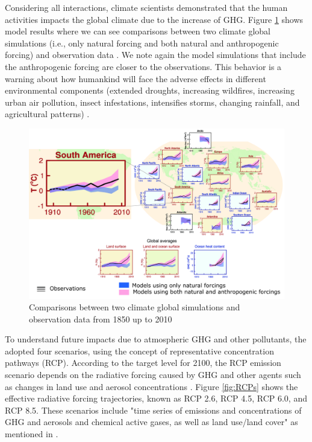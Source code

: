 Considering all interactions, climate scientists demonstrated that the human activities impacts the global climate due to the increase of GHG.
Figure \ref{fig:global} shows model results where we can see comparisons between two climate global simulations (i.e., only natural forcing and both natural and anthropogenic forcing) and observation data \citep{IPCC2013}.
We note again the model simulations that include the anthropogenic forcing are closer to the observations.
This behavior is a warning about how humankind will face the adverse effects in different environmental components (extended droughts, increasing wildfires, increasing urban air pollution, insect infestations, intensifies storms, changing rainfall, and agricultural patterns) \citep{Farmer2013}.

\begin{figure}[htb]
  \begin{center}
    \includegraphics[width=14cm]{fig/FigSPM-06.pdf}
  \end{center}
  \caption{Comparisons between two climate global simulations and observation data from 1850 up to 2010  \citep[ilustration adapted from][]{IPCC2013} }
  \label{fig:global}
\end{figure}

To understand future impacts due to atmospheric GHG and other pollutants, the \citet{IPCC2013} adopted four scenarios, using the concept of representative concentration pathways (RCP). 
According to the target level for 2100, the RCP emission scenario depends on the radiative forcing caused by GHG and other agents such as changes in land use and aerosol concentrations \citep{VanVuuren2011a}. 
Figure \ref{fig:RCPs} shows the effective radiative forcing trajectories, known as RCP 2.6, RCP 4.5, RCP 6.0, and RCP 8.5.
These scenarios include "time series of emissions and concentrations of GHG and aerosols and chemical active gases, as well as land use/land cover" as mentioned in \citep[Most et al., 2000; cited in][]{IPCC2013}.

